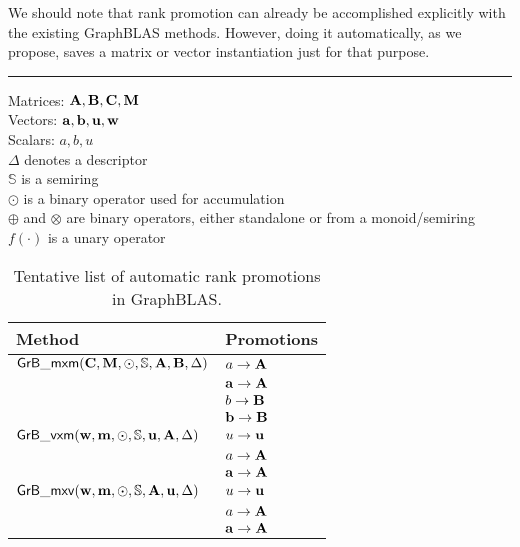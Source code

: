 We should note that rank promotion can already be accomplished explicitly
with the existing GraphBLAS methods. However, doing it automatically, as
we propose, saves a matrix or vector instantiation just for that purpose.

\begin{table}[htb]
	\hrule
	\caption{Tentative list of automatic rank promotions in GraphBLAS.}
	\label{Tab:Promotions}
	Matrices: ${\bf A},{\bf B},{\bf C},{\bf M}$ \\
	Vectors: ${\bf a},{\bf b},{\bf u},{\bf w}$ \\
	Scalars: $a,b,u$ \\
	$\Delta$ denotes a descriptor \\
	$\mathbb{S}$ is a semiring \\
	$\odot$ is a binary operator used for accumulation \\
	$\oplus$ and $\otimes$ are binary operators, either standalone or from a monoid/semiring \\
	$f(\cdot)$ is a unary operator \\
	\begin{center}
		\begin{tabular}{|l|l|} \hline
			Method		& Promotions \\ \hline
			${\sf GrB\_mxm}({\bf C},{\bf M},\odot,\mathbb{S},{\bf A},{\bf B},\Delta)$	& $a \rightarrow {\bf A}$ \\
														& ${\bf a} \rightarrow {\bf A}$ \\
														& $b \rightarrow {\bf B}$ \\
														& ${\bf b} \rightarrow {\bf B}$ \\
			\hline
			${\sf GrB\_vxm}({\bf w},{\bf m},\odot,\mathbb{S},{\bf u},{\bf A},\Delta)$	& $u \rightarrow {\bf u}$ \\
														& $a \rightarrow {\bf A}$ \\
                                                                                                                & ${\bf a} \rightarrow {\bf A}$ \\
			\hline
			${\sf GrB\_mxv}({\bf w},{\bf m},\odot,\mathbb{S},{\bf A},{\bf u},\Delta)$	& $u \rightarrow {\bf u}$ \\
														& $a \rightarrow {\bf A}$ \\
                                                                                                                & ${\bf a} \rightarrow {\bf A}$ \\

\end{tabular}
\end{center}
\end{table}
